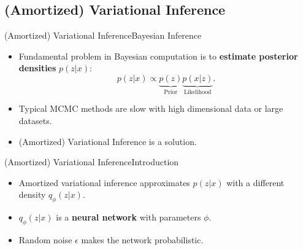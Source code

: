 \documentclass[handout]{beamer}
\begin{document}
\subsection{(Amortized) Variational Inference}

\begin{frame}{(Amortized) Variational Inference}{Bayesian Inference}
  \begin{itemize}
  \item {
    Fundamental problem in Bayesian computation is to \textbf{estimate posterior densities} $p(z|x)$:
  }
  \begin{equation*}
p(z|x)\propto \underbrace{p(z)}_\text{Prior}\underbrace{p(x|z)}_\text{Likelihood}.
\end{equation*}
  \item {
    Typical MCMC methods are slow with high dimensional data or large datasets.
  }
  \vspace{0.5cm}
  \item {
    (Amortized) Variational Inference is a solution.
  }
  \end{itemize}
\end{frame}
\begin{frame}{(Amortized) Variational Inference}{Introduction}
\begin{itemize}
\item Amortized variational inference approximates $p(z|x)$ with a different density $q_\phi(z|x)$.
\vspace{0.1cm}
\item $q_\phi(z|x)$ is a \textbf{neural network} with parameters $\phi$.
\vspace{0.1cm}
\item Random noise $\epsilon$ makes the network probabilistic.
\begin{figure}[h]
  \centering
\end{figure}
\end{itemize}
\end{frame}
\end{document}
